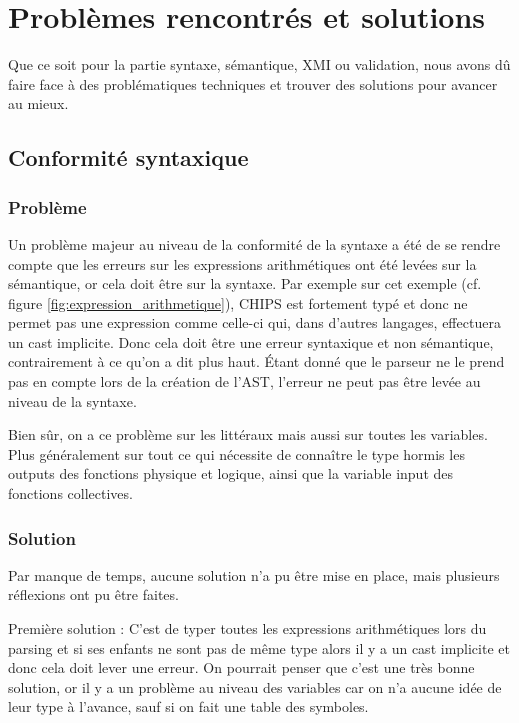 \documentclass[a4paper, 11pt]{article}
\begin{document}
\section{Problèmes rencontrés et solutions}
\label{sec:problemes_solutions}
Que ce soit pour la partie syntaxe, sémantique, XMI ou validation, nous avons dû faire face à des problématiques techniques et trouver des solutions pour avancer au mieux.

\newpage
\subsection{Conformité syntaxique}

\subsubsection*{Problème}

Un problème majeur au niveau de la conformité de la syntaxe a été de se rendre compte que les erreurs sur les expressions arithmétiques ont été levées sur la sémantique, or cela doit être sur la syntaxe.
Par exemple sur cet exemple (cf. figure \ref{fig:expression_arithmetique}), CHIPS est fortement typé et donc ne permet pas une expression comme celle-ci qui, dans d'autres langages, effectuera un cast implicite. Donc cela doit être une erreur syntaxique et non sémantique, contrairement à ce qu'on a dit plus haut. Étant donné que le parseur ne le prend pas en compte lors de la création de l'AST, l'erreur ne peut pas être levée au niveau de la syntaxe.

Bien sûr, on a ce problème sur les littéraux mais aussi sur toutes les variables. Plus généralement sur tout ce qui nécessite de connaître le type hormis les outputs des fonctions physique et logique, ainsi que la variable input des fonctions collectives.

\subsubsection*{Solution}

Par manque de temps, aucune solution n'a pu être mise en place, mais plusieurs réflexions ont pu être faites.

Première solution : C'est de typer toutes les expressions arithmétiques lors du parsing et si ses enfants ne sont pas de même type alors il y a un cast implicite et donc cela doit lever une erreur. On pourrait penser que c'est une très bonne solution, or il y a un problème au niveau des variables car on n'a aucune idée de leur type à l'avance, sauf si on fait une table des symboles.
\end{document}
